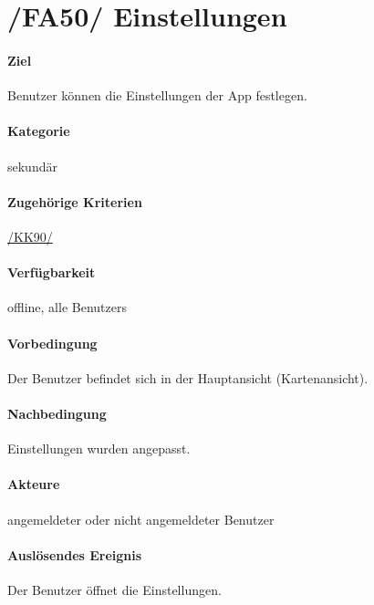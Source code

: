 \section[Einstellungen]{/FA50/ Einstellungen}
\label{/FA50/}
\paragraph{Ziel}
\Gls{Benutzer} können die Einstellungen der App festlegen.
\paragraph{Kategorie}
sekundär
\paragraph{Zugehörige Kriterien}
\hyperref[/KK90/]{/KK90/}
\paragraph{Verfügbarkeit}
\gls{offline}, alle \Glspl{Benutzer}
\paragraph{Vorbedingung}
Der \Gls{Benutzer} befindet sich in der Hauptansicht (\Gls{Kartenansicht}).
\paragraph{Nachbedingung}
Einstellungen wurden angepasst.
\paragraph{Akteure}
angemeldeter oder nicht angemeldeter \Gls{Benutzer}
\paragraph{Auslösendes Ereignis}
Der \Gls{Benutzer} öffnet die Einstellungen.
